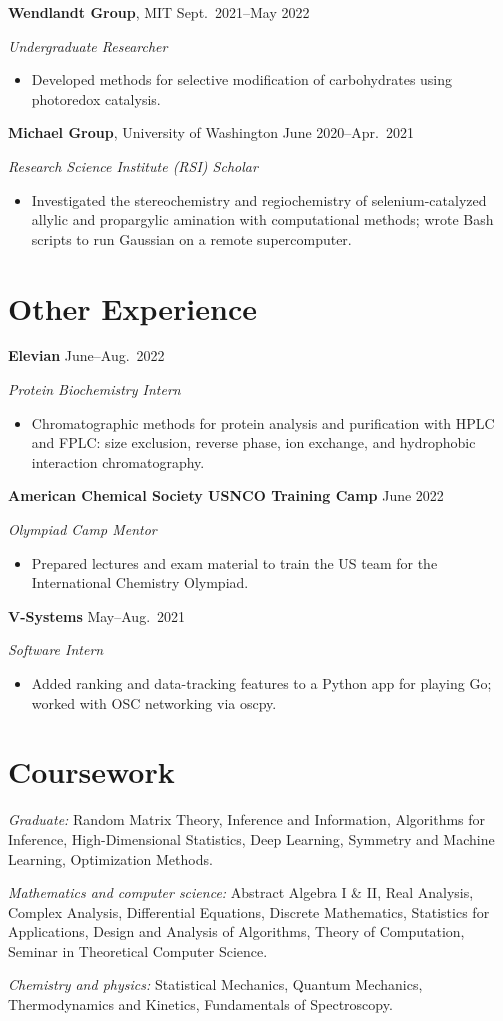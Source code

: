 \documentclass[11pt]{article}
\newcommand{\entry}[2]{\needspace{4\baselineskip}\noindent #1 \hfill {\color{mist}#2}\par}
\newcommand{\role}[1]{{\color{mist}\itshape #1}\par}
\begin{document}
\entry{\textbf{Wendlandt Group}, MIT}{Sept.\ 2021--May 2022}
\role{Undergraduate Researcher}
\begin{itemize}
  \item Developed methods for selective modification of carbohydrates using photoredox catalysis.
\end{itemize}

\entry{\textbf{Michael Group}, University of Washington}{June 2020--Apr.\ 2021}
\role{Research Science Institute (RSI) Scholar}
\begin{itemize}
  \item Investigated the stereochemistry and regiochemistry of selenium-catalyzed allylic and propargylic amination with computational methods; wrote Bash scripts to run Gaussian on a remote supercomputer.
\end{itemize}

\section{Other Experience}
\entry{\textbf{Elevian}}{June--Aug.\ 2022}
\role{Protein Biochemistry Intern}
\begin{itemize}
  \item Chromatographic methods for protein analysis and purification with HPLC and FPLC: size exclusion, reverse phase, ion exchange, and hydrophobic interaction chromatography.
\end{itemize}

\entry{\textbf{American Chemical Society USNCO Training Camp}}{June 2022}
\role{Olympiad Camp Mentor}
\begin{itemize}
  \item Prepared lectures and exam material to train the US team for the International Chemistry Olympiad.
\end{itemize}

\entry{\textbf{V-Systems}}{May--Aug.\ 2021}
\role{Software Intern}
\begin{itemize}
  \item Added ranking and data-tracking features to a Python app for playing Go; worked with OSC networking via oscpy.
\end{itemize}

\section{Coursework}
\textit{Graduate:} Random Matrix Theory, Inference and Information, Algorithms for Inference, High-Dimensional Statistics, Deep Learning, Symmetry and Machine Learning, Optimization Methods.\par\vspace{0.4em}
\textit{Mathematics and computer science:} Abstract Algebra I \& II, Real Analysis, Complex Analysis, Differential Equations, Discrete Mathematics, Statistics for Applications, Design and Analysis of Algorithms, Theory of Computation, Seminar in Theoretical Computer Science.\par\vspace{0.4em}
\textit{Chemistry and physics:} Statistical Mechanics, Quantum Mechanics, Thermodynamics and Kinetics, Fundamentals of Spectroscopy.
\end{document}
